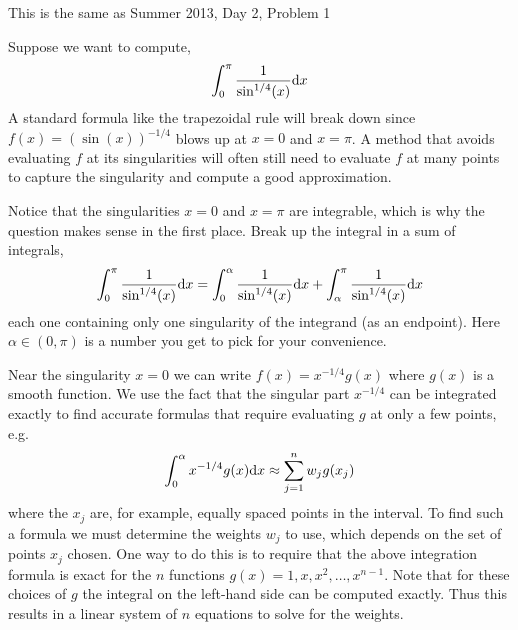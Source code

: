 \documentclass[10pt]{article}
\begin{document}
\begin{problem}
This is the same as Summer 2013, Day 2, Problem 1
\end{problem}

\begin{problem}
Suppose we want to compute,
\begin{align*}
    \int_{0}^{\pi} \frac{1}{\sin^{1/4}(x)} \mathrm{d} x
\end{align*}
    A standard formula like the trapezoidal rule will break down since \( f(x) = (\sin(x))^{-1/4} \) blows up at \( x = 0 \) and \( x = \pi \). A method that avoids evaluating \( f \) at its singularities will often still need to evaluate \( f \) at many points to capture the singularity and compute a good approximation. 

    Notice that the singularities \( x = 0 \) and \( x=\pi \) are integrable, which is why the question makes sense in the first place. Break up the integral in a sum of integrals,
    \begin{align*}
    \int_{0}^{\pi} \frac{1}{\sin^{1/4}(x)} \mathrm{d} x    
    =
    \int_{0}^{\alpha} \frac{1}{\sin^{1/4}(x)} \mathrm{d} x    
    +\int_{\alpha}^{\pi} \frac{1}{\sin^{1/4}(x)} \mathrm{d} x    
    \end{align*}
    each one containing only one singularity of the integrand (as an endpoint). Here \( \alpha\in(0,\pi) \) is a number you get to pick for your convenience.

Near the singularity \( x = 0 \) we can write \( f(x) = x^{-1/4} g(x) \) where \( g(x) \) is a smooth function.
    We use the fact that the singular part \( x^{-1/4} \) can be integrated exactly to find accurate formulas that require evaluating \( g \) at only a few points, e.g.
\begin{align*}
    \int_0^\alpha x^{-1/4}g(x)\mathrm{d} x \approx \sum_{j=1}^{n} w_j g(x_j)
\end{align*}
    where the \( x_j \) are, for example, equally spaced points in the interval. To find such a formula we must determine the weights \( w_j \) to use, which depends on the set of points \( x_j \) chosen.
    One way to do this is to require that the above integration formula is exact for the  \( n \) functions \( g(x) = 1, x, x^2, \ldots , x^{n-1} \). Note that for these choices of \( g \) the integral on the left-hand side can be computed exactly. Thus this results in a linear system of \( n \) equations to solve for the weights.


\end{problem}
\end{document}
